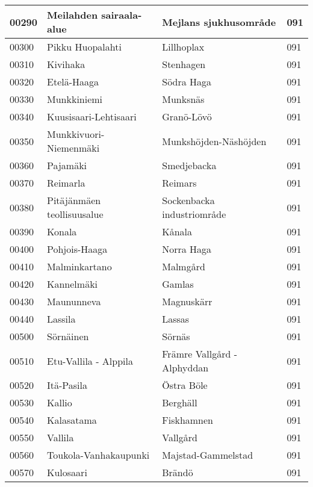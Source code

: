 \begin{center}
\begin{longtable}{|l l l l|}
        00290 & Meilahden sairaala-alue & Mejlans sjukhusområde & 091 \\ [0.25ex] \hline
        00300 & Pikku Huopalahti & Lillhoplax & 091 \\ [0.25ex] \hline
        00310 & Kivihaka & Stenhagen & 091 \\ [0.25ex] \hline
        00320 & Etelä-Haaga & Södra Haga & 091 \\ [0.25ex] \hline
        00330 & Munkkiniemi & Munksnäs & 091 \\ [0.25ex] \hline
        00340 & Kuusisaari-Lehtisaari & Granö-Lövö & 091 \\ [0.25ex] \hline
        00350 & Munkkivuori-Niemenmäki & Munkshöjden-Näshöjden & 091\\ [0.25ex] \hline
        00360 & Pajamäki & Smedjebacka & 091 \\ [0.25ex] \hline
        00370 & Reimarla & Reimars & 091 \\ [0.25ex] \hline
        00380 & Pitäjänmäen teollisuusalue & Sockenbacka industriområde & 091 \\ [0.25ex] \hline
        00390 & Konala & Kånala & 091 \\ [0.25ex] \hline
        00400 & Pohjois-Haaga & Norra Haga & 091 \\ [0.25ex] \hline
        00410 & Malminkartano & Malmgård & 091 \\ [0.25ex] \hline
        00420 & Kannelmäki & Gamlas & 091 \\ [0.25ex] \hline
        00430 & Maununneva & Magnuskärr & 091 \\ [0.25ex] \hline
        00440 & Lassila & Lassas & 091 \\ [0.25ex] \hline
        00500 & Sörnäinen & Sörnäs & 091 \\ [0.25ex] \hline
        00510 & Etu-Vallila - Alppila & Främre Vallgård - Alphyddan & 091 \\ [0.25ex] \hline
        00520 & Itä-Pasila & Östra Böle & 091 \\ [0.25ex] \hline
        00530 & Kallio & Berghäll & 091 \\ [0.25ex] \hline
        00540 & Kalasatama & Fiskhamnen & 091 \\ [0.25ex] \hline
        00550 & Vallila & Vallgård & 091 \\ [0.25ex] \hline
        00560 & Toukola-Vanhakaupunki & Majstad-Gammelstad & 091 \\ [0.25ex] \hline
        00570 & Kulosaari & Brändö & 091 \\ [0.25ex] \hline

\end{longtable}
\end{center}
